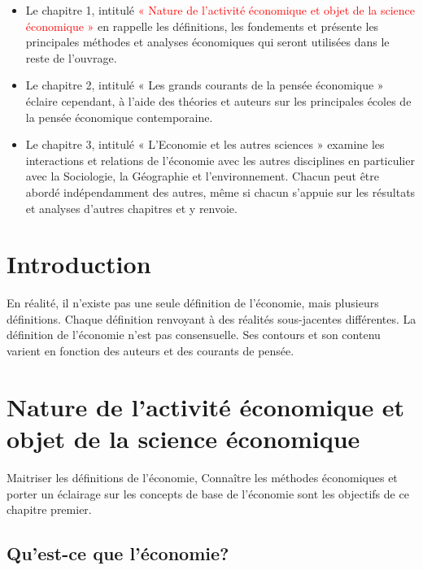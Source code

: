 \documentclass[
]{book}
\begin{document}
\begin{itemize}
\item
  Le chapitre 1, intitulé \textcolor{red}{« Nature de l’activité économique et objet de la science économique »} en rappelle les définitions, les fondements et présente les principales méthodes et analyses économiques qui seront utilisées dans le reste de l'ouvrage.
\item
  Le chapitre 2, intitulé « Les grands courants de la pensée économique » éclaire cependant, à l'aide des théories et auteurs sur les principales écoles de la pensée économique contemporaine.
\item
  Le chapitre 3, intitulé « L'Economie et les autres sciences » examine les interactions et relations de l'économie avec les autres disciplines en
  particulier avec la Sociologie, la Géographie et l'environnement. Chacun peut être abordé indépendamment des autres, même si chacun s'appuie sur les résultats et analyses d'autres chapitres et y renvoie.
\end{itemize}

\hypertarget{intro}{%
\chapter{Introduction}\label{intro}}

En réalité, il n'existe pas une seule définition de l'économie, mais plusieurs définitions. Chaque définition renvoyant à des réalités sous-jacentes différentes. La définition de l'économie n'est pas consensuelle. Ses contours et son contenu varient en fonction des auteurs et des courants de pensée.

\hypertarget{nature-de-lactivituxe9-uxe9conomique-et-objet-de-la-science-uxe9conomique}{%
\chapter{Nature de l'activité économique et objet de la science économique}\label{nature-de-lactivituxe9-uxe9conomique-et-objet-de-la-science-uxe9conomique}}

Maitriser les définitions de l'économie, Connaître les méthodes
économiques et porter un éclairage sur les concepts de base de
l'économie sont les objectifs de ce chapitre premier.

\hypertarget{quest-ce-que-luxe9conomie}{%
\section{Qu'est-ce que l'économie?}\label{quest-ce-que-luxe9conomie}}
\end{document}
